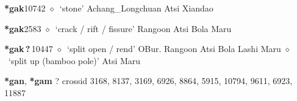   \begin{list}{}{\leftmargin=1.5em \itemindent=-1.5em}
  \item {\footnotesize \textbf{*gak}}{\tiny 10742}
         $\diamond$~`stone'
         Achang\_Longchuan 
\hspace{1ex}
         Atsi 
\hspace{1ex}
         Xiandao 
  \item {\footnotesize \textbf{*gak}}{\tiny 2583}
\hspace{1ex}
         $\diamond$~`crack / rift / fissure'
         Rangoon 
\hspace{1ex}
         Atsi 
\hspace{1ex}
         Bola 
\hspace{1ex}
         Maru 
  \item {\footnotesize \textbf{*gak\,?\,}}{\tiny 10447}
\hspace{1ex}
         $\diamond$~`split open / rend'
         OBur. 
\hspace{1ex}
         Rangoon 
\hspace{1ex}
         Atsi 
\hspace{1ex}
         Bola 
\hspace{1ex}
         Lashi 
\hspace{1ex}
         Maru 
\hspace{1ex}
         $\diamond$~`split up (bamboo pole)'
         Atsi 
\hspace{1ex}
         Maru 
  \end{list}
\item
\textbf{*gan}, \textbf{*gam}
?
  {\tiny crossid 3168, 8137, 3169, 6926, 8864, 5915, 10794, 9611, 6923, 11887}
